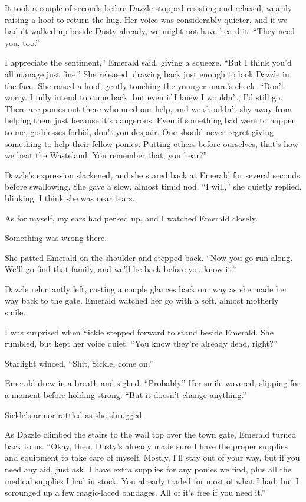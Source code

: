 It took a couple of seconds before Dazzle stopped resisting and relaxed, wearily raising a hoof to return the hug. Her voice was considerably quieter, and if we hadn’t walked up beside Dusty already, we might not have heard it. “They need you, too.”

\leavevmode{}I appreciate the sentiment,” Emerald said, giving a squeeze. “But I think you’d all manage just fine.” She released, drawing back just enough to look Dazzle in the face. She raised a hoof, gently touching the younger mare’s cheek. “Don’t worry. I fully intend to come back, but even if I knew I wouldn’t, I’d still go. There are ponies out there who need our help, and we shouldn’t shy away from helping them just because it’s dangerous. Even if something bad were to happen to me, goddesses forbid, don’t you despair. One should never regret giving something to help their fellow ponies. Putting others before ourselves, that’s how we beat the Wasteland. You remember that, you hear?”

Dazzle’s expression slackened, and she stared back at Emerald for several seconds before swallowing. She gave a slow, almost timid nod. “I will,” she quietly replied, blinking. I think she was near tears.

As for myself, my ears had perked up, and I watched Emerald closely.

Something was wrong there.

She patted Emerald on the shoulder and stepped back. “Now you go run along. We’ll go find that family, and we’ll be back before you know it.”

Dazzle reluctantly left, casting a couple glances back our way as she made her way back to the gate. Emerald watched her go with a soft, almost motherly smile.

I was surprised when Sickle stepped forward to stand beside Emerald. She rumbled, but kept her voice quiet. “You know they’re already dead, right?”

Starlight winced. “Shit, Sickle, come on.”

Emerald drew in a breath and sighed. “Probably.” Her smile wavered, slipping for a moment before holding strong. “But it doesn’t change anything.”

Sickle’s armor rattled as she shrugged.

As Dazzle climbed the stairs to the wall top over the town gate, Emerald turned back to us. “Okay, then. Dusty’s already made sure I have the proper supplies and equipment to take care of myself. Mostly, I’ll stay out of your way, but if you need any aid, just ask. I have extra supplies for any ponies we find, plus all the medical supplies I had in stock. You already traded for most of what I had, but I scrounged up a few magic-laced bandages. All of it’s free if you need it.”

